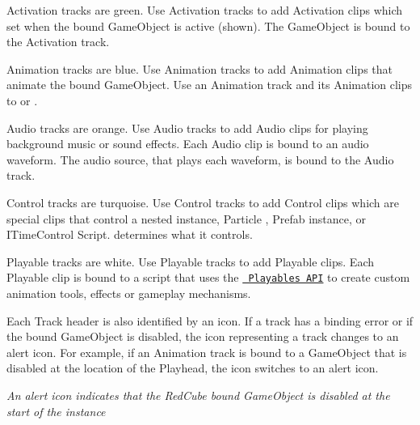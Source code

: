 \begin{DoxyItemize}
\item Activation tracks are green. Use Activation tracks to add Activation clips which set when the bound Game\+Object is active (shown). The Game\+Object is bound to the Activation track.
\item Animation tracks are blue. Use Animation tracks to add Animation clips that animate the bound Game\+Object. Use an Animation track and its Animation clips to  or .
\item Audio tracks are orange. Use Audio tracks to add Audio clips for playing background music or sound effects. Each Audio clip is bound to an audio waveform. The audio source, that plays each waveform, is bound to the Audio track.
\item Control tracks are turquoise. Use Control tracks to add Control clips which are special clips that control a nested  instance, Particle , Prefab instance, or ITime\+Control Script.  determines what it controls.
\item Playable tracks are white. Use Playable tracks to add Playable clips. Each Playable clip is bound to a script that uses the \href{https://docs.unity3d.com/Manual/Playables.html}{\texttt{ Playables API}} to create custom animation tools, effects or gameplay mechanisms.
\end{DoxyItemize}

Each Track header is also identified by an icon. If a track has a binding error or if the bound Game\+Object is disabled, the icon representing a track changes to an alert icon. For example, if an Animation track is bound to a Game\+Object that is disabled at the location of the Playhead, the icon switches to an alert icon.



{\itshape An alert icon indicates that the Red\+Cube bound Game\+Object is disabled at the start of the  instance} 
